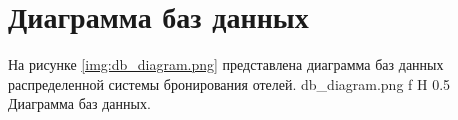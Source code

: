 \section{Диаграмма баз данных}
На рисунке \ref{img:db_diagram.png} представлена диаграмма баз данных распределенной системы бронирования отелей.
{db_diagram.png}
{f}
{H}
{0.5\textheight}
{Диаграмма баз данных.}
